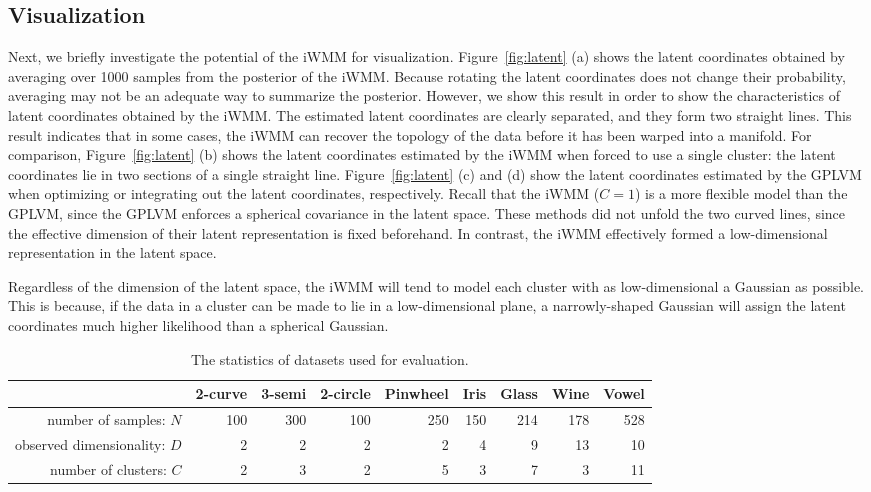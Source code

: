 \subsection{Visualization}
Next, we briefly investigate the potential of the iWMM for visualization.  Figure~\ref{fig:latent} (a) shows the latent coordinates obtained by averaging over 1000 samples from the posterior of the iWMM.
Because rotating the latent coordinates does not change their probability, averaging may not be an adequate way to summarize the posterior.
However, we show this result in order to 
show the characteristics of latent coordinates obtained by the iWMM.
The estimated latent coordinates are clearly separated, and they form two straight lines.
This result indicates that in some cases, the iWMM can recover the topology of the data before it has been warped into a manifold.
For comparison, Figure~\ref{fig:latent} (b) shows the latent coordinates 
estimated by the iWMM when forced to use a single cluster: the latent coordinates lie in two sections of a single straight line.
Figure~\ref{fig:latent} (c) and (d) show the latent coordinates 
estimated by the GPLVM when optimizing or integrating out the latent coordinates, respectively.  
Recall that the iWMM ($C=1$) is a more flexible model than the GPLVM, since the GPLVM enforces a spherical covariance in the latent space.
These methods did not unfold the two curved lines, since the effective dimension of their latent representation is fixed beforehand.
In contrast, the iWMM effectively formed a low-dimensional representation in the latent space. 

Regardless of the dimension of the latent space, the iWMM will tend to model each cluster with as low-dimensional a Gaussian as possible. 
This is because, if the data in a cluster can be made to lie in a low-dimensional plane, a narrowly-shaped Gaussian will assign the latent coordinates much higher likelihood than a spherical Gaussian.

\begin{table*}[ht!]
\centering
\caption[Datasets used for evaluation of the iWMM]
{The statistics of datasets used for evaluation.}
\label{tab:statistics}
\begin{tabular}{rrrrrrrrr}
\hline
 & 2-curve & 3-semi & 2-circle & Pinwheel & Iris  & Glass  & Wine  & Vowel  \\
\hline
number of samples: $N$ & 100 & 300 & 100 & 250 & 150 & 214 & 178 & 528 \\
observed dimensionality: $D$ & 2 & 2 & 2 & 2 & 4 & 9 & 13 & 10 \\
number of clusters: $C$ & 2 & 3 & 2 & 5 & 3 & 7 & 3 & 11 \\
\hline
\end{tabular}
\end{table*}

